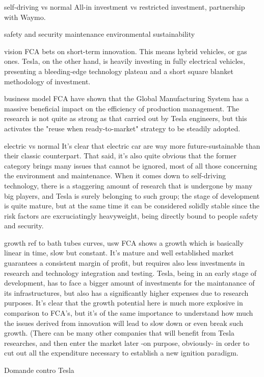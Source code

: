 self-driving vs normal
    All-in investment vs restricted investment, partnership with Waymo.

safety and security
maintenance
environmental sustainability


vision
    FCA bets on short-term innovation. This means hybrid vehicles, or gas ones. Tesla, on the other hand, is heavily investing in fully electrical vehicles, presenting a bleeding-edge technology plateau and a short square blanket methodology of investment.
    
business model
    FCA have shown that the Global Manufacturing System has a massive beneficial impact on the efficiency of production management. The research is not quite as strong as that carried out by Tesla engineers, but this activates the "reuse when ready-to-market" strategy to be steadily adopted.
    
electric vs normal
    It's clear that electric car are way more future-sustainable than their classic counterpart. That said, it's also quite obvious that the former category brings many issues that cannot be ignored, most of all those concerning the environment and maintenance. When it comes down to self-driving technology, there is a staggering amount of research that is undergone by many big players, and Tesla is surely belonging to such group; the stage of development is quite mature, but at the same time it can be considered solidly stable since the risk factors are excruciatingly heavyweight, being directly bound to people safety and security.
    
growth
    {ref to bath tubes curves, usw} FCA shows a growth which is basically linear in time, slow but constant. It's mature and well established market guarantees a consistent margin of profit, but requires also less investments in research and technology integration and testing. Tesla, being in an early stage of development, has to face a bigger amount of investments for the maintanance of its infrastructures, but also has a significantly higher expenses due to research purposes. It's clear that the growth potential here is much more explosive in comparison to FCA's, but it's of the same importance to understand how much the issues derived from innovation will lead to slow down or even break such growth. (There can be many other companies that will benefit from Tesla researches, and then enter the market later -on purpose, obviously- in order to cut out all the expenditure necessary to establish a new ignition paradigm. 


Domande contro Tesla


